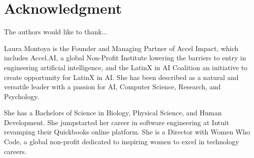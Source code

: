 \documentclass[conference]{IEEEtran}
\begin{document}
\section*{Acknowledgment}

The authors would like to thank...





\begin{IEEEbiography}{Laura Montoya}
is the Founder and Managing Partner of Accel Impact, which includes Accel.AI, a global Non-Profit Institute lowering the barriers to entry in engineering artificial intelligence, and the LatinX in AI Coalition an initiative to create opportunity for LatinX in AI. She has been described as a natural and versatile leader with a passion for AI, Computer Science, Research, and Psychology. 

She has a Bachelors of Science in Biology, Physical Science, and Human Development. She jumpstarted her career in software engineering at Intuit revamping their Quickbooks online platform. She is a Director with Women Who Code, a global non-profit dedicated to inspiring women to excel in technology careers.
\end{IEEEbiography}
\end{document}
